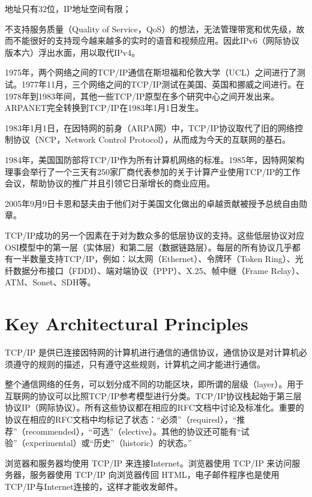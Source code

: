 \begin{compactitem}
\item 地址只有32位，IP地址空间有限；
\item 不支持服务质量（Quality of Service，QoS）的想法，无法管理带宽和优先级，故而不能很好的支持现今越来越多的实时的语音和视频应用。因此IPv6（网际协议版本六）浮出水面，用以取代IPv4。
\end{compactitem}

1975年，两个网络之间的TCP/IP通信在斯坦福和伦敦大学（UCL）之间进行了测试。1977年11月，三个网络之间的TCP/IP测试在美国、英国和挪威之间进行。在1978年到1983年间，其他一些TCP/IP原型在多个研究中心之间开发出来。ARPANET完全转换到TCP/IP在1983年1月1日发生。

1983年1月1日，在因特网的前身（ARPA网）中，TCP/IP协议取代了旧的网络控制协议（NCP，Network Control Protocol），从而成为今天的互联网的基石。

1984年，美国国防部将TCP/IP作为所有计算机网络的标准。1985年，因特网架构理事会举行了一个三天有250家厂商代表参加的关于计算产业使用TCP/IP的工作会议，帮助协议的推广并且引领它日渐增长的商业应用。

2005年9月9日卡恩和瑟夫由于他们对于美国文化做出的卓越贡献被授予总统自由勋章。


TCP/IP成功的另一个因素在于对为数众多的低层协议的支持。这些低层协议对应OSI模型中的第一层（实体层）和第二层（数据链路层）。每层的所有协议几乎都有一半数量支持TCP/IP，例如：以太网（Ethernet）、令牌环（Token Ring）、光纤数据分布接口（FDDI）、端对端协议（PPP）、X.25、帧中继（Frame Relay）、ATM、Sonet、SDH等。

\section{Key Architectural Principles}



TCP/IP 是供已连接因特网的计算机进行通信的通信协议，通信协议是对计算机必须遵守的规则的描述，只有遵守这些规则，计算机之间才能进行通信。

整个通信网络的任务，可以划分成不同的功能区块，即所谓的层级（layer）。用于互联网的协议可以比照TCP/IP参考模型进行分类。TCP/IP协议栈起始于第三层协议IP（网际协议）。所有这些协议都在相应的RFC文档中讨论及标准化。重要的协议在相应的RFC文档中均标记了状态：“必须”（required），“推荐”（recommended），“可选”（elective）。其他的协议还可能有“试验”（experimental）或“历史”（historic）的状态。”



浏览器和服务器均使用 TCP/IP 来连接Internet。浏览器使用 TCP/IP 来访问服务器，服务器使用 TCP/IP 向浏览器传回 HTML，电子邮件程序也是使用 TCP/IP与Internet连接的，这样才能收发邮件。

